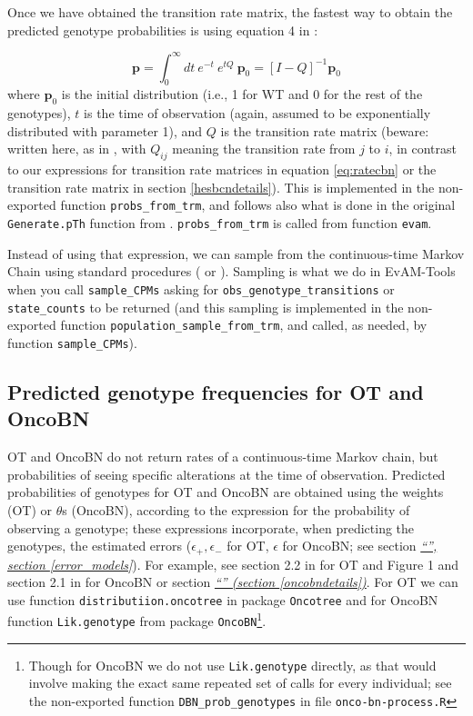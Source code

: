 \documentclass[a4paper,11pt]{article}
\newcommand*{\qref}[1]{\hyperref[{#1}]{\textit{``\nameref*{#1}'' (section \ref*{#1})}}}
\newcommand*{\qrefP}[1]{\hyperref[{#1}]{\textit{``\nameref*{#1}'', section \ref*{#1}}}}
\begin{document}
Once we have obtained the transition rate matrix, the fastest way to obtain the predicted genotype probabilities is using equation 4 in
\cite{schill2020modelling}:

\begin{equation}
\mathbf{p} = \int_{0}^{\infty} dt \ e^{-t} \ e^{t Q}\ \mathbf{p}_0 = [I - Q]^{-1} \mathbf{p}_0
\end{equation}
where $\mathbf{p}_0$ is the initial distribution (i.e., 1 for WT and 0 for the rest of the genotypes), $t$ is the time of observation (again, assumed to be exponentially distributed with parameter 1), and $Q$ is the transition rate matrix (beware: written here, as in \citealp{schill2020modelling}, with $Q_{ij}$ meaning the transition rate from $j$ to $i$, in contrast to our expressions for transition rate matrices in equation \ref{eq:ratecbn} or the transition rate matrix in section \ref{hesbcndetails}). This is implemented in the non-exported function \texttt{probs\_from\_trm}, and follows also what is done in the original \texttt{Generate.pTh} function from \cite{schill2020modelling}. \texttt{probs\_from\_trm} is called from function \texttt{evam}.


Instead of using that expression, we can sample from the continuous-time Markov Chain using standard procedures (\citealp[e.g., ch.~5 in][]{wilkinson2019stochastic} or \citealp[Algorithm 1 in][]{gotovos2021}). Sampling is what we do in EvAM-Tools when you call \texttt{sample\_CPMs} asking for \texttt{obs\_genotype\_transitions} or \texttt{state\_counts} to be returned (and this sampling is implemented in the non-exported function \texttt{population\_sample\_from\_trm}, and called, as needed, by function  \texttt{sample\_CPMs}).




\subsection{Predicted genotype frequencies for OT and OncoBN}
\label{predicted-ot-oncobn}

OT and OncoBN do not return rates of a continuous-time Markov chain, but probabilities of seeing specific alterations at the time of observation. 
Predicted probabilities of genotypes for OT and OncoBN are obtained using the weights (OT) or $\theta$s (OncoBN), according to the expression for the probability of observing a genotype; these expressions incorporate, when predicting the genotypes, the estimated errors ($\epsilon_+, \epsilon_-$ for OT, $\epsilon$ for OncoBN; see section \qrefP{error_models}). For example, see section 2.2 in \cite{Szabo2008} for OT and Figure 1 and section 2.1 in \cite{nicol2021oncogenetic} for OncoBN or section \qref{oncobndetails}. For OT we can use function \texttt{distributiion.oncotree} in package \texttt{Oncotree} and for OncoBN function \texttt{Lik.genotype} from package \texttt{OncoBN}\footnote{Though for OncoBN we do not use \texttt{Lik.genotype} directly, as that would involve making the exact same repeated set of calls for every individual; see the non-exported function \texttt{DBN\_prob\_genotypes} in file \texttt{onco-bn-process.R}}.
\end{document}
